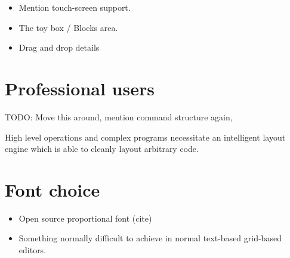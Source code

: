 \begin{itemize}
	\item Mention touch-screen support.
	\item The toy box / Blocks area.
	\item Drag and drop details
\end{itemize}

\section{Professional users}

TODO: Move this around, mention command structure again,

High level operations and complex programs necessitate an intelligent layout
engine which is able to cleanly layout arbitrary code.

\section{Font choice}

\begin{itemize}
	\item Open source proportional font (cite)
	\item Something normally difficult to achieve in normal text-based grid-based
	editors.
	
\end{itemize}
